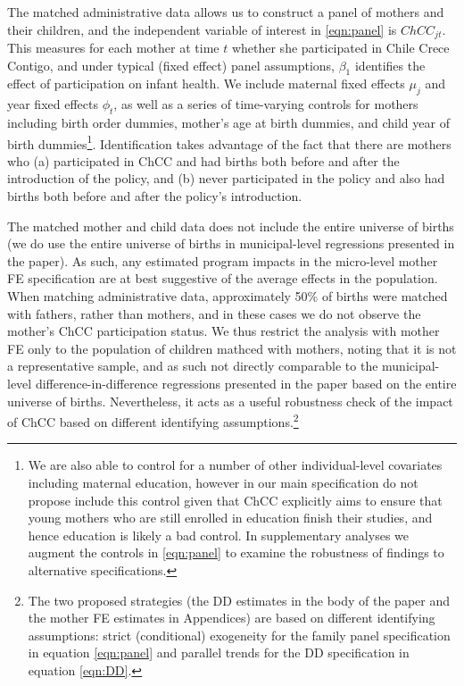 \documentclass[12pt]{article}
\begin{document}
\begin{spacing}{1.4}
The matched administrative data allows us to construct a panel
of mothers and their children, and the independent variable of
interest in \ref{eqn:panel} is $ChCC_{jt}$.  This measures for
each mother at time $t$ whether she participated in Chile Crece
Contigo, and under typical (fixed effect) panel assumptions,
$\beta_1$ identifies the effect of participation on infant health.
We include maternal fixed effects $\mu_j$ and year fixed effects
$\phi_t$, as well as a series of time-varying controls for
mothers including birth order dummies, mother's age at birth
dummies, and child year of birth dummies\footnote{We are also
  able to control for a number of other individual-level
  covariates including maternal education, however in our main
  specification do not propose include this control given that
  ChCC explicitly aims to ensure that young mothers who are still
  enrolled in education finish their studies, and hence education
  is likely a bad control.  In supplementary analyses we augment
  the controls in \ref{eqn:panel} to examine the robustness of
  findings to alternative specifications.}.  Identification takes
advantage of the fact that there are mothers who (a) participated
in ChCC and had births both before and after the introduction of
the policy, and (b) never participated in the policy and also had
births both before and after the policy's introduction.

The matched mother and child data does not include the entire
universe of births (we do use the entire universe of births in
municipal-level regressions presented in the paper).  As such,
any estimated program impacts in the micro-level mother FE
specification are at best suggestive of the average effects in
the population.  When matching administrative data, approximately
50\% of births were matched with fathers, rather than mothers,
and in these cases we do not observe the mother's ChCC
participation status.  We thus restrict the analysis with
mother FE only to the population of children mathced with mothers,
noting that it is not a representative sample, and as such not
directly comparable to the municipal-level
difference-in-difference regressions presented in the paper based
on the entire universe of births.  Nevertheless, it acts as a
useful robustness check of the impact of ChCC based on different
identifying assumptions.\footnote{The two proposed strategies (the
  DD estimates in the body of the paper and the mother FE estimates
  in Appendices) are based on different identifying assumptions:
  strict (conditional) exogeneity for the family panel specification
  in equation \ref{eqn:panel} and parallel trends for the DD
  specification in equation  \ref{eqn:DD}.}


\end{spacing}
\end{document}
